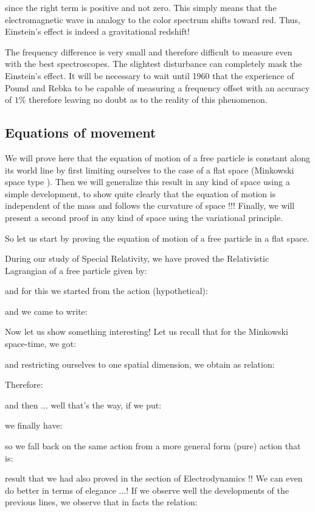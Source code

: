 	since the right term is positive and not zero. This simply means that the electromagnetic wave in analogy to the color spectrum shifts toward red. Thus, Einstein's effect is indeed a gravitational redshift!

	The frequency difference is very small and therefore difficult to measure even with the best spectroscopes. The slightest disturbance can completely mask the Einstein's effect. It will be necessary to wait until 1960 that the experience of Pound and Rebka to be capable of measuring a frequency offset with an accuracy of $1\%$ therefore leaving no doubt as to the reality of this phenomenon.
	
	\subsection{Equations of movement}
	We will prove here that the equation of motion of a free particle is constant along its world line by first limiting ourselves to the case of a flat space (Minkowski space type ). Then we will generalize this result in any kind of space using a simple development, to show quite clearly that the equation of motion is independent of the mass and follows the curvature of space !!! Finally, we will present a second proof in any kind of space using the variational principle.

	So let us start by proving the equation of motion of a free particle in a flat space.

	During our study of Special Relativity, we have proved the Relativistic Lagrangian of a free particle given by:
	
	and for this we started from the action (hypothetical):
	
	and we came to write:
	
	Now let us show something interesting! Let us recall that for the Minkowski space-time, we got:
	
	and restricting ourselves to one spatial dimension, we obtain as relation:
	
	Therefore:
	
	and then ... well that's the way, if we put:
	
	we finally have:
	
	so we fall back on the same action from a more general form (pure) action that is:
	
	result that we had also proved in the section of Electrodynamics !! We can even do better in terms of elegance ...! If we observe well the developments of the previous lines, we observe that in facts the relation:
	
